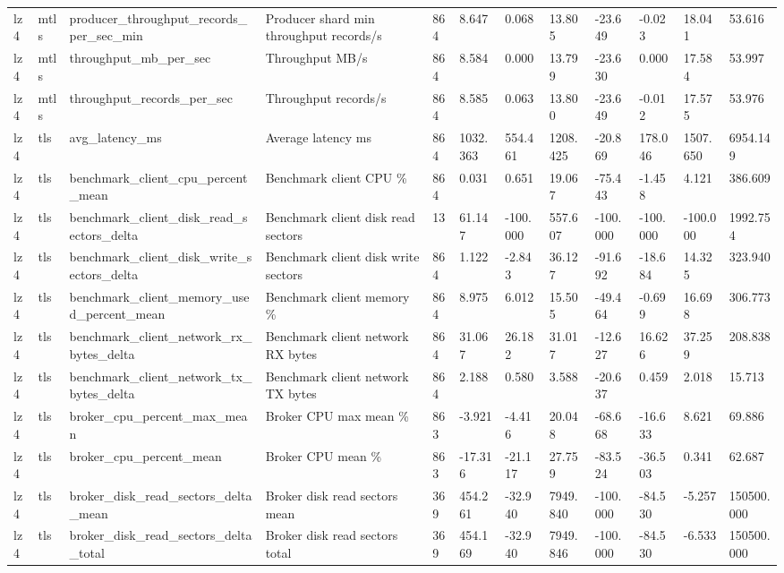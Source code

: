 \begin{longtable}{llllllllllll}
lz4 & mtls & producer\_throughput\_records\_per\_sec\_min & Producer shard min throughput records/s & 864 & 8.647 & 0.068 & 13.805 & -23.649 & -0.023 & 18.041 & 53.616 \\
lz4 & mtls & throughput\_mb\_per\_sec & Throughput MB/s & 864 & 8.584 & 0.000 & 13.799 & -23.630 & 0.000 & 17.584 & 53.997 \\
lz4 & mtls & throughput\_records\_per\_sec & Throughput records/s & 864 & 8.585 & 0.063 & 13.800 & -23.649 & -0.012 & 17.575 & 53.976 \\
lz4 & tls & avg\_latency\_ms & Average latency ms & 864 & 1032.363 & 554.461 & 1208.425 & -20.869 & 178.046 & 1507.650 & 6954.149 \\
lz4 & tls & benchmark\_client\_cpu\_percent\_mean & Benchmark client CPU \% & 864 & 0.031 & 0.651 & 19.067 & -75.443 & -1.458 & 4.121 & 386.609 \\
lz4 & tls & benchmark\_client\_disk\_read\_sectors\_delta & Benchmark client disk read sectors & 13 & 61.147 & -100.000 & 557.607 & -100.000 & -100.000 & -100.000 & 1992.754 \\
lz4 & tls & benchmark\_client\_disk\_write\_sectors\_delta & Benchmark client disk write sectors & 864 & 1.122 & -2.843 & 36.127 & -91.692 & -18.684 & 14.325 & 323.940 \\
lz4 & tls & benchmark\_client\_memory\_used\_percent\_mean & Benchmark client memory \% & 864 & 8.975 & 6.012 & 15.505 & -49.464 & -0.699 & 16.698 & 306.773 \\
lz4 & tls & benchmark\_client\_network\_rx\_bytes\_delta & Benchmark client network RX bytes & 864 & 31.067 & 26.182 & 31.017 & -12.627 & 16.626 & 37.259 & 208.838 \\
lz4 & tls & benchmark\_client\_network\_tx\_bytes\_delta & Benchmark client network TX bytes & 864 & 2.188 & 0.580 & 3.588 & -20.637 & 0.459 & 2.018 & 15.713 \\
lz4 & tls & broker\_cpu\_percent\_max\_mean & Broker CPU max mean \% & 863 & -3.921 & -4.416 & 20.048 & -68.668 & -16.633 & 8.621 & 69.886 \\
lz4 & tls & broker\_cpu\_percent\_mean & Broker CPU mean \% & 863 & -17.316 & -21.117 & 27.759 & -83.524 & -36.503 & 0.341 & 62.687 \\
lz4 & tls & broker\_disk\_read\_sectors\_delta\_mean & Broker disk read sectors mean & 369 & 454.261 & -32.940 & 7949.840 & -100.000 & -84.530 & -5.257 & 150500.000 \\
lz4 & tls & broker\_disk\_read\_sectors\_delta\_total & Broker disk read sectors total & 369 & 454.169 & -32.940 & 7949.846 & -100.000 & -84.530 & -6.533 & 150500.000 \\

\end{longtable}
